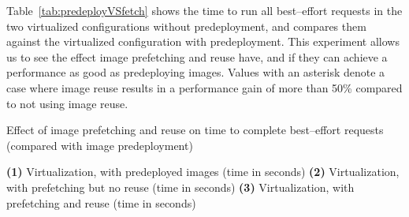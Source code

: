 Table~\ref{tab:predeployVSfetch} shows the time to run all best--effort requests in the two virtualized configurations without predeployment, and compares them against the virtualized configuration with predeployment. This experiment allows us to see the effect image prefetching and reuse have, and if they can achieve a performance as good as predeploying images. Values with an asterisk denote a case where image reuse results in a performance gain of more than 50\% compared to not using image reuse.

\begin{table}
\begin{center}
\caption{Effect of image prefetching and reuse on time to complete best--effort requests (compared with image predeployment)}
\textbf{(1)} Virtualization, with predeployed images (time in seconds)
\textbf{(2)} Virtualization, with prefetching but no reuse (time in seconds)
\textbf{(3)} Virtualization, with prefetching and reuse (time in seconds)


\end{center}
\end{table}
